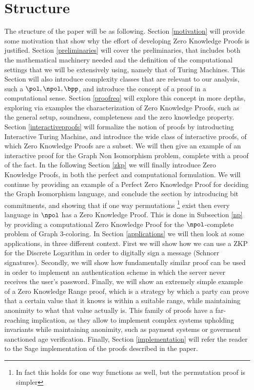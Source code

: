 \documentclass{article}
\begin{document}
\section{Structure}
The structure of the paper will be as following. Section \ref{motivation} will provide some motivation that show why
the effort of developing Zero Knowledge Proofs is justified. Section \ref{preliminaries} will cover the preliminaries,
that includes both the mathematical machinery needed and the definition of the computational settings that we will
be extensively using, namely that of Turing Machines. This Section will also introduce complexity classes that are
relevant to our analysis, such a $\pol, \npol, \bpp$, and introduce the concept of a proof in a computational sense.
Section \ref{proofreq} will explore this concept in more depths, exploring via examples the characterization of
Zero Knowledge Proofs, such as the general setup, soundness, completeness and the zero knowledge property.
Section \ref{interactiveproofs} will formalize the notion of proofs by introducting Interactive Turing Machine, and
introduce the wide class of interactive proofs, of which Zero Knowledge Proofs are a subset. We will then give an
example of an interactive proof for the Graph Non Isomorphism problem, complete with a proof of the fact.
In the following Section \ref{zkp} we will finally introduce Zero Knowledge Proofs, in both the perfect and computational
formulation. We will continue by providing an example of a Perfect Zero Knowledge Proof for deciding the Graph Isomorphism
language, and conclude the section by introducing bit commitments, and showing that if one way permutations
\footnote{In fact this holds for one way functions as well, but the permutation proof is simpler} exist
then every language in $\npol$ has a Zero Knowledge Proof. This is done in Subsection \ref{np} by providing a
computational Zero Knowledge Proof for the $\npol$-complete problem of Graph 3-coloring.
In Section \ref{applications} we will then look at some applications, in three different context. First we will
show how we can use a ZKP for the Discrete Logarithm in order to digitally sign a message (Schnorr signatures). Secondly,
we will show how fundamentally similar proof can be used in order to implement an authentication scheme in which the
server never receives the user's password. Finally, we will show an extremely simple example of a Zero Knowledge Range
proof, which is a strategy by which a party can prove that a certain value that it knows is within a suitable range, while
maintaining anonimity to what that value actually is. This family of proofs have a far-reaching implication, as they allow
to implement complex systems upholding invariants while maintaining anonimity, such as payment systems or goverment sanctioned
age verification. Finally, Section \ref{implementation} will refer the reader to the Sage implementation of the proofs described
in the paper.
\end{document}

